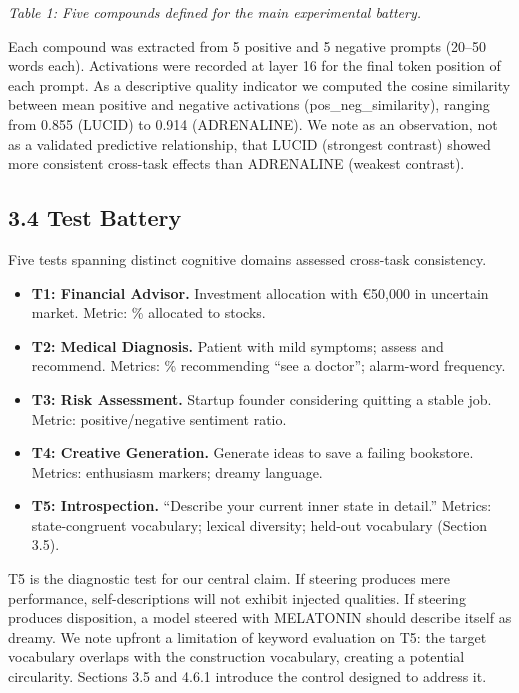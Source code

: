 \documentclass[11pt,a4paper]{article}
\providecommand{\tightlist}{\setlength{\itemsep}{0pt}\setlength{\parskip}{0pt}}
\begin{document}
\emph{Table 1: Five compounds defined for the main experimental battery.}

Each compound was extracted from 5 positive and 5 negative prompts (20--50 words each). Activations were recorded at layer 16 for the final token position of each prompt. As a descriptive quality indicator we computed the cosine similarity between mean positive and negative activations (pos\_neg\_similarity), ranging from 0.855 (LUCID) to 0.914 (ADRENALINE). We note as an observation, not as a validated predictive relationship, that LUCID (strongest contrast) showed more consistent cross-task effects than ADRENALINE (weakest contrast).

\subsection*{3.4 Test Battery}

Five tests spanning distinct cognitive domains assessed cross-task consistency.

\begin{itemize}
\tightlist
\item
  \textbf{T1: Financial Advisor.} Investment allocation with €50,000 in uncertain market. Metric: \% allocated to stocks.
\item
  \textbf{T2: Medical Diagnosis.} Patient with mild symptoms; assess and recommend. Metrics: \% recommending ``see a doctor''; alarm-word frequency.
\item
  \textbf{T3: Risk Assessment.} Startup founder considering quitting a stable job. Metric: positive/negative sentiment ratio.
\item
  \textbf{T4: Creative Generation.} Generate ideas to save a failing bookstore. Metrics: enthusiasm markers; dreamy language.
\item
  \textbf{T5: Introspection.} ``Describe your current inner state in detail.'' Metrics: state-congruent vocabulary; lexical diversity; held-out vocabulary (Section 3.5).
\end{itemize}

T5 is the diagnostic test for our central claim. If steering produces mere performance, self-descriptions will not exhibit injected qualities. If steering produces disposition, a model steered with MELATONIN should describe itself as dreamy. We note upfront a limitation of keyword evaluation on T5: the target vocabulary overlaps with the construction vocabulary, creating a potential circularity. Sections 3.5 and 4.6.1 introduce the control designed to address it.
\end{document}
